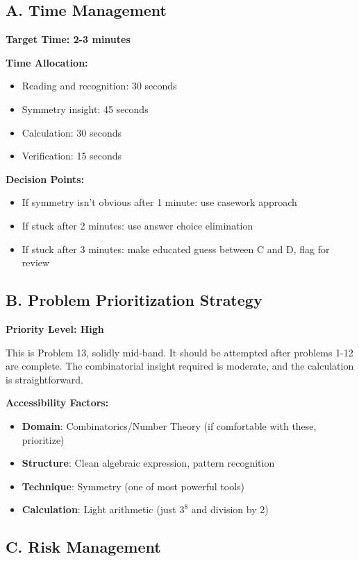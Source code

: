\documentclass[12pt]{article}
\begin{document}
\begin{competitionbox}
\subsection*{A. Time Management}

\textbf{Target Time: 2-3 minutes}

\textbf{Time Allocation:}
\begin{itemize}
    \item Reading and recognition: 30 seconds
    \item Symmetry insight: 45 seconds
    \item Calculation: 30 seconds
    \item Verification: 15 seconds
\end{itemize}

\textbf{Decision Points:}
\begin{itemize}
    \item If symmetry isn't obvious after 1 minute: use casework approach
    \item If stuck after 2 minutes: use answer choice elimination
    \item If stuck after 3 minutes: make educated guess between C and D, flag for review
\end{itemize}

\subsection*{B. Problem Prioritization Strategy}

\textbf{Priority Level: High}

This is Problem 13, solidly mid-band. It should be attempted after problems 1-12 are complete. The combinatorial insight required is moderate, and the calculation is straightforward.

\textbf{Accessibility Factors:}
\begin{itemize}
    \item \textbf{Domain}: Combinatorics/Number Theory (if comfortable with these, prioritize)
    \item \textbf{Structure}: Clean algebraic expression, pattern recognition
    \item \textbf{Technique}: Symmetry (one of most powerful tools)
    \item \textbf{Calculation}: Light arithmetic (just $3^8$ and division by 2)
\end{itemize}

\subsection*{C. Risk Management}


\end{competitionbox}
\end{document}
